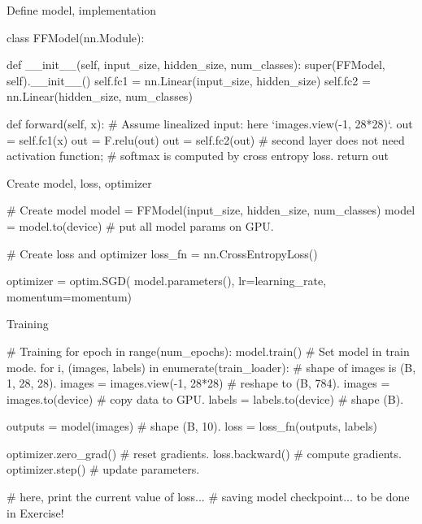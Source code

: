 \begin{frame}[fragile]{Define model, implementation}
\begin{python}
class FFModel(nn.Module):

    def __init__(self, input_size, hidden_size, num_classes):
        super(FFModel, self).__init__()
        self.fc1 = nn.Linear(input_size, hidden_size) 
        self.fc2 = nn.Linear(hidden_size, num_classes)  
    
    def forward(self, x):
        # Assume linealized input: here `images.view(-1, 28*28)`.
        out = self.fc1(x)
        out = F.relu(out)
        out = self.fc2(out)
        # second layer does not need activation function;
        # softmax is computed by cross entropy loss.
        return out
\end{python}
\end{frame}

\begin{frame}[fragile]{Create model, loss, optimizer}
\begin{python}
# Create model
model = FFModel(input_size, hidden_size, num_classes)
model = model.to(device)  # put all model params on GPU.

# Create loss and optimizer
loss_fn = nn.CrossEntropyLoss()

optimizer = optim.SGD(
    model.parameters(), lr=learning_rate, momentum=momentum)
\end{python}
\end{frame}

\begin{frame}[fragile]{Training}
\vspace{-5mm}
\begin{python}
# Training
for epoch in range(num_epochs):
    model.train()  # Set model in train mode.
    for i, (images, labels) in enumerate(train_loader):
        # shape of images is (B, 1, 28, 28).
        images = images.view(-1, 28*28)  # reshape to (B, 784).
        images = images.to(device)  # copy data to GPU.
        labels = labels.to(device)  # shape (B).

        outputs = model(images)  # shape (B, 10).
        loss = loss_fn(outputs, labels)

        optimizer.zero_grad()  # reset gradients.
        loss.backward()  # compute gradients.
        optimizer.step()  # update parameters.
        
        # here, print the current value of loss...
        # saving model checkpoint... to be done in Exercise!
\end{python}
\end{frame}

